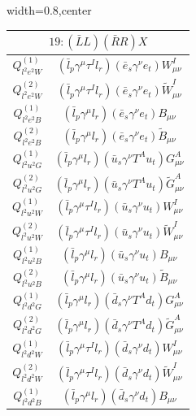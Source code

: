 \begin{table}[H]
\begin{center}
\begin{adjustbox}{width=0.8\textwidth,center}
\small
\begin{minipage}[t]{4.9cm}
\renewcommand{\arraystretch}{1.5}
\begin{tabular}[t]{c|c}
\multicolumn{2}{c}{\boldmath$19:(\bar L L)(\bar R R)X$} \\
\hline
$Q_{l^2e^2W}^{(1)}$  &  $(\bar l_p \gamma^\mu \tau^I l_r) (\bar e_s \gamma^\nu e_t) W^I_{\mu\nu}$ \\
%
$Q_{l^2e^2W}^{(2)}$  &  $(\bar l_p \gamma^\mu \tau^I l_r) (\bar e_s \gamma^\nu e_t) \widetilde W^I_{\mu\nu}$ \\
%
$Q_{l^2e^2B}^{(1)}$  &  $(\bar l_p \gamma^\mu l_r) (\bar e_s \gamma^\nu e_t) B_{\mu\nu}$ \\
%
$Q_{l^2e^2B}^{(2)}$  &  $(\bar l_p \gamma^\mu l_r) (\bar e_s \gamma^\nu e_t) \widetilde B_{\mu\nu}$ \\
%
$Q_{l^2u^2G}^{(1)}$  &  $(\bar l_p \gamma^\mu l_r) (\bar u_s \gamma^\nu T^A u_t) G^A_{\mu\nu}$ \\
%
$Q_{l^2u^2G}^{(2)}$  &  $(\bar l_p \gamma^\mu l_r) (\bar u_s \gamma^\nu T^A u_t) \widetilde G^A_{\mu\nu}$ \\
%
$Q_{l^2u^2W}^{(1)}$  &  $(\bar l_p \gamma^\mu \tau^I l_r) (\bar u_s \gamma^\nu u_t) W^I_{\mu\nu}$ \\
%
$Q_{l^2u^2W}^{(2)}$  &  $(\bar l_p \gamma^\mu \tau^I l_r) (\bar u_s \gamma^\nu u_t) \widetilde W^I_{\mu\nu}$ \\
%
$Q_{l^2u^2B}^{(1)}$  &  $(\bar l_p \gamma^\mu l_r) (\bar u_s \gamma^\nu u_t) B_{\mu\nu}$ \\
%
$Q_{l^2u^2B}^{(2)}$  &  $(\bar l_p \gamma^\mu l_r) (\bar u_s \gamma^\nu u_t) \widetilde B_{\mu\nu}$ \\
%
$Q_{l^2d^2G}^{(1)}$  &  $(\bar l_p \gamma^\mu l_r) (\bar d_s \gamma^\nu T^A d_t) G^A_{\mu\nu}$ \\
%
$Q_{l^2d^2G}^{(2)}$  &  $(\bar l_p \gamma^\mu l_r) (\bar d_s \gamma^\nu T^A d_t) \widetilde G^A_{\mu\nu}$ \\
%
$Q_{l^2d^2W}^{(1)}$  &  $(\bar l_p \gamma^\mu \tau^I l_r) (\bar d_s \gamma^\nu d_t) W^I_{\mu\nu}$ \\
%
$Q_{l^2d^2W}^{(2)}$  &  $(\bar l_p \gamma^\mu \tau^I l_r) (\bar d_s \gamma^\nu d_t) \widetilde W^I_{\mu\nu}$ \\
%
$Q_{l^2d^2B}^{(1)}$  &  $(\bar l_p \gamma^\mu l_r) (\bar d_s \gamma^\nu d_t) B_{\mu\nu}$ \\

\end{tabular}
\end{minipage}
\end{adjustbox}
\end{center}
\end{table}
